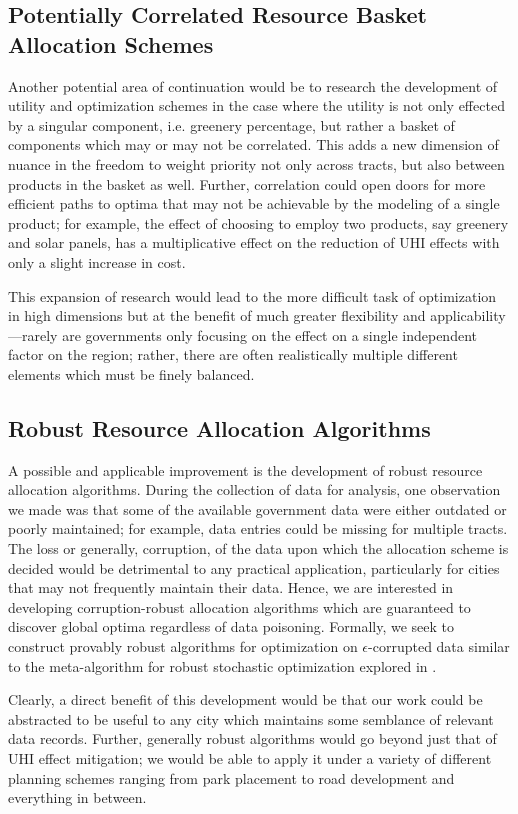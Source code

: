 \documentclass[11pt]{article}
\begin{document}
\subsection{Potentially Correlated Resource Basket Allocation Schemes}
Another potential area of continuation would be to research the development of utility and optimization schemes in the case where the utility is not only effected by a singular component, i.e. greenery percentage, but rather a basket of components which may or may not be correlated. This adds a new dimension of nuance in the freedom to weight priority not only across tracts, but also between products in the basket as well. Further, correlation could open doors for more efficient paths to optima that may not be achievable by the modeling of a single product; for example, the effect of choosing to employ two products, say greenery and solar panels, has a multiplicative effect on the reduction of UHI effects with only a slight increase in cost.

This expansion of research would lead to the more difficult task of optimization in high dimensions but at the benefit of much greater flexibility and applicability---rarely are governments only focusing on the effect on a single independent factor on the region; rather, there are often realistically multiple different elements which must be finely balanced.

\subsection{Robust Resource Allocation Algorithms}
A possible and applicable improvement is the development of robust resource allocation algorithms. During the collection of data for analysis, one observation we made was that some of the available government data were either outdated or poorly maintained; for example, data entries could be missing for multiple tracts. The loss or generally, corruption, of the data upon which the allocation scheme is decided would be detrimental to any practical application, particularly for cities that may not frequently maintain their data. Hence, we are interested in developing corruption-robust allocation algorithms which are guaranteed to discover global optima regardless of data poisoning. Formally, we seek to construct provably robust algorithms for optimization on $\epsilon$-corrupted data similar to the meta-algorithm for robust stochastic optimization explored in \cite{diakonikolas_2019}.

Clearly, a direct benefit of this development would be that our work could be abstracted to be useful to any city which maintains some semblance of relevant data records. Further, generally robust algorithms would go beyond just that of UHI effect mitigation; we would be able to apply it under a variety of different planning schemes ranging from park placement to road development and everything in between.
\end{document}
